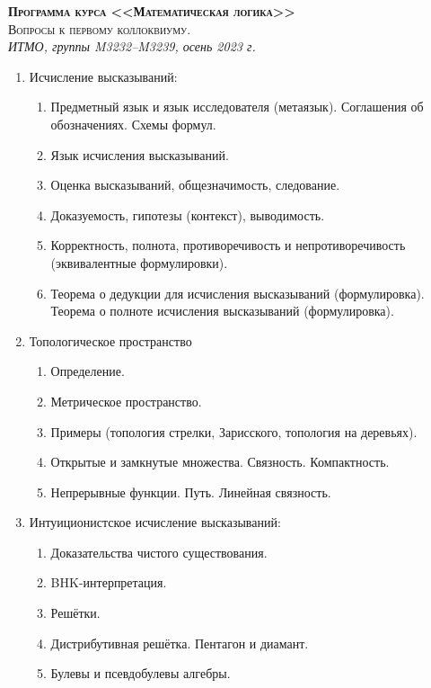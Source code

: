 \documentclass[11pt,a4paper,oneside]{scrartcl}
\begin{document}
\pagestyle{empty}

\begin{center}
{\large\scshape\bfseries Программа курса <<Математическая логика>>}\\
{\large\scshape Вопросы к первому коллоквиуму.}\\
\itshape ИТМО, группы M3232--M3239, осень 2023 г.
\end{center}


\begin{enumerate}
\item Исчисление высказываний:
\begin{enumerate}
\item Предметный язык и язык исследователя (метаязык). Соглашения об обозначениях. Схемы формул.
\item Язык исчисления высказываний.
\item Оценка высказываний, общезначимость, следование.
\item Доказуемость, гипотезы (контекст), выводимость.
\item Корректность, полнота, противоречивость и непротиворечивость (эквивалентные формулировки).
\item Теорема о дедукции для исчисления высказываний (формулировка). Теорема о полноте исчисления высказываний (формулировка).
\end{enumerate}
\item Топологическое пространство
\begin{enumerate}
\item Определение.
\item Метрическое пространство.
\item Примеры (топология стрелки, Зарисского, топология на деревьях). 
\item Открытые и замкнутые множества. Связность. Компактность. 
\item Непрерывные функции. Путь. Линейная связность. 
\end{enumerate}
\item Интуиционистское исчисление высказываний:
\begin{enumerate}
\item Доказательства чистого существования.
\item BHK-интерпретация. 
\item Решётки. 
\item Дистрибутивная решётка. Пентагон и диамант.
\item Булевы и псевдобулевы алгебры.

\end{enumerate}
\end{enumerate}
\end{document}
